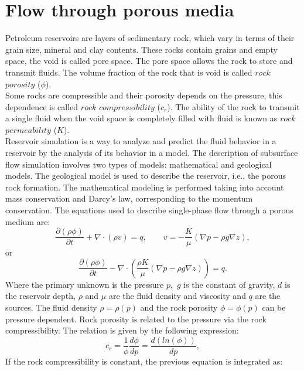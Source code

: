 \documentclass[review]{elsarticle}
\begin{document}
 \section{Flow through porous media}\label{fpm}
Petroleum reservoirs are layers of sedimentary rock, which vary in terms of their grain size, mineral
and clay contents. 
These rocks contain grains and empty space, the void is called pore space.
The pore space allows the rock to 
store and transmit fluids. The volume fraction of the rock that is void is called $rock$
$porosity$ ($\phi$).\\
Some rocks are compressible and their porosity depends on the pressure, this dependence is called 
$rock$ $compressibility$ ($c_r$). 
The ability of the rock to transmit a single fluid when the void space is completely filled with fluid
is known as $rock$ $permeability$ (${K}$). \\
Reservoir simulation is a way to analyze and predict the fluid behavior in a reservoir
by the analysis of its behavior in a model. The description of subsurface flow simulation involves two types of models: 
mathematical and geological models. The geological model is used to describe the reservoir, i.e., the porous rock formation. 
The mathematical modeling is performed taking into account mass conservation and Darcy's law,
corresponding to the momentum conservation. The equations used to describe single-phase flow through a porous medium are:
\begin{equation}\label{eq:ce}
\frac{\partial (\rho \phi)}{\partial t}+ \nabla \cdot ( \rho {v})=q, \qquad v=-\frac{K}{\mu}(\nabla p-\rho g\nabla z),
\end{equation}
or
\begin{equation}\label{eq:ce1}
\frac{\partial (\rho \phi)}{\partial t}- \nabla \cdot \left( \frac{\rho{K}}{\mu}(\nabla {p}-\rho g\nabla z)\right)=q.
\end{equation}
Where the primary unknown is the pressure ${p},$ $g$ is the constant of gravity, $d$ is the reservoir depth,
$\rho$ and $\mu$ are the fluid density and viscosity and $q$ are the sources. The fluid density $\rho=\rho(p)$ and the rock porosity $\phi=\phi(p)$ can be pressure dependent.
Rock porosity is related to the pressure via the rock compressibility. The relation is given by the following expression:
\begin{equation*}
 c_r=\frac{1}{\phi}\frac{d\phi}{dp}=\frac{d(ln(\phi))}{dp},
\end{equation*}
If the rock compressibility is constant, the previous equation is integrated as:
\end{document}
